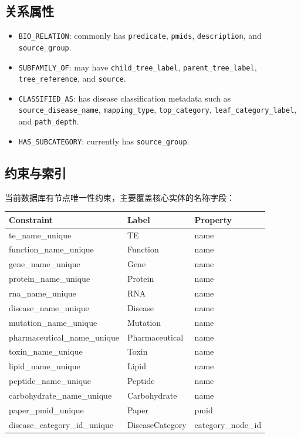 \documentclass[UTF8]{ctexart}
\begin{document}
\subsection{关系属性}

\begin{itemize}
  \item \texttt{BIO\_RELATION}: commonly has \texttt{predicate}, \texttt{pmids}, \texttt{description}, and \texttt{source\_group}.
  \item \texttt{SUBFAMILY\_OF}: may have \texttt{child\_tree\_label}, \texttt{parent\_tree\_label}, \texttt{tree\_reference}, and \texttt{source}.
  \item \texttt{CLASSIFIED\_AS}: has disease classification metadata such as \texttt{source\_disease\_name}, \texttt{mapping\_type}, \texttt{top\_category}, \texttt{leaf\_category\_label}, and \texttt{path\_depth}.
  \item \texttt{HAS\_SUBCATEGORY}: currently has \texttt{source\_group}.
\end{itemize}

\subsection{约束与索引}

当前数据库有节点唯一性约束，主要覆盖核心实体的名称字段：

\begin{longtable}{lll}
\toprule
Constraint & Label & Property \\
\midrule
\endhead
te\_name\_unique & TE & name \\
function\_name\_unique & Function & name \\
gene\_name\_unique & Gene & name \\
protein\_name\_unique & Protein & name \\
rna\_name\_unique & RNA & name \\
disease\_name\_unique & Disease & name \\
mutation\_name\_unique & Mutation & name \\
pharmaceutical\_name\_unique & Pharmaceutical & name \\
toxin\_name\_unique & Toxin & name \\
lipid\_name\_unique & Lipid & name \\
peptide\_name\_unique & Peptide & name \\
carbohydrate\_name\_unique & Carbohydrate & name \\
paper\_pmid\_unique & Paper & pmid \\
disease\_category\_id\_unique & DiseaseCategory & category\_node\_id \\
\bottomrule
\end{longtable}
\end{document}
